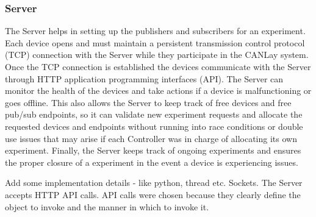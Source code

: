 \documentclass[letterpaper,twocolumn,12pt]{article}
\begin{document}
\subsubsection{Server}
The Server helps in setting up the publishers and subscribers for an experiment. Each device opens and must maintain a persistent transmission control protocol (TCP) connection with the Server while they participate in the CANLay system. Once the TCP connection is established the devices communicate with the Server through HTTP application programming interfaces (API). The Server can monitor the health of the devices and take actions if a device is malfunctioning or goes offline. This also allows the Server to keep track of free devices and free pub/sub endpoints, so it can validate new experiment requests and allocate the requested devices and endpoints without running into race conditions or double use issues that may arise if each Controller was in charge of allocating its own experiment. Finally, the Server keeps track of ongoing experiments and ensures the proper closure of a experiment in the event a device is experiencing issues.

Add some implementation details - like python, thread etc. Sockets.
The Server accepts HTTP API calls. API calls were chosen because they clearly define the object to invoke and the manner in which to invoke it.



\end{document}
